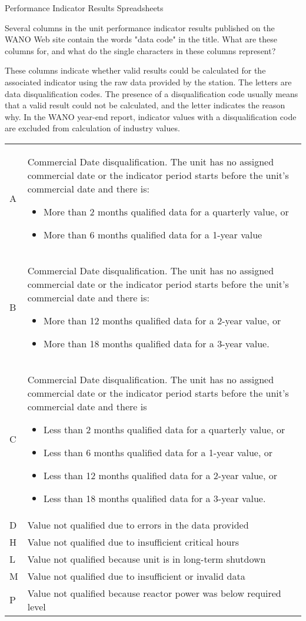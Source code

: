 Performance Indicator Results Spreadsheets

    Several columns in the unit performance indicator results published on the WANO Web site contain the words "data code" in the title. What are these columns for, and what do the single characters in these columns represent?

    These columns indicate whether valid results could be calculated for the associated indicator using the raw data provided by the station. The letters are data disqualification codes. The presence of a disqualification code usually means that a valid result could not be calculated, and the letter indicates the reason why. In the WANO year-end report, indicator values with a disqualification code are excluded from calculation of industry values.
\begin{tabular}{p{0.5cm}p{14cm}}
A & Commercial Date disqualification. The unit has no assigned
    commercial date or the indicator period starts before the unit's
    commercial date and there is:
    \begin{itemize}
    \item More than 2 months qualified data for a quarterly value, or
    \item More than 6 months qualified data for a 1-year value
    \end{itemize}\\
B & Commercial Date disqualification. The unit has no assigned commercial date or the indicator period starts before the unit's commercial date and there is:
\begin{itemize}
\item More than 12 months qualified data for a 2-year value, or
\item More than 18 months qualified data for a 3-year value.
\end{itemize}\\
C & Commercial Date disqualification. The unit has no assigned commercial date or the indicator period starts before the unit's commercial date and there is
\begin{itemize}
\item Less than 2 months qualified data for a quarterly value, or
\item Less than 6 months qualified data for a 1-year value, or
\item Less than 12 months qualified data for a 2-year value, or
\item Less than 18 months qualified data for a 3-year value.
\end{itemize}\\
D & Value not qualified due to errors in the data provided\\
H & Value not qualified due to insufficient critical hours\\
L & Value not qualified because unit is in long-term shutdown\\
M & Value not qualified due to insufficient or invalid data\\
P & Value not qualified because reactor power was below required
    level\\
\end{tabular}

